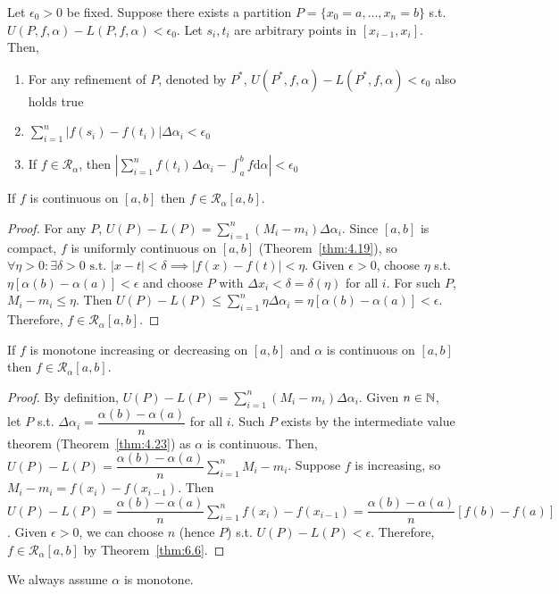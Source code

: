 \begin{thm}[7]
	Let $\epsilon_0>0$ be fixed. Suppose there exists a partition $P=\{x_0=a,\ldots ,x_n=b\} $ s.t. $U(P,f,\alpha)-L(P,f,\alpha)<\epsilon_0$.
	Let $s_{i},t_{i}$ are arbitrary points in $[x_{i-1},x_i]$.
	Then,
	\begin{enumerate}
		\item For any refinement of $P$, denoted by $P^{*}$, $U(P^{*},f,\alpha)-L(P^{*},f,\alpha)<\epsilon_0$ also holds true
		\item  $\sum_{i=1}^{n}{\left|f(s_i)-f(t_i)\right| \Delta \alpha_i}<\epsilon_0$
		\item If $f \in \mathscr{R}_{\alpha}$, then $\left| \sum_{i=1}^{n}{f(t_i) \Delta \alpha_i}-\int_{a}^{b}{f\mathrm{d}\alpha} \right| <\epsilon_0$
	\end{enumerate}
\end{thm}


\begin{thm}[8]
	If $f$ is continuous on $[a,b]$ then $f \in \mathscr{R}_{\alpha}[a,b]$.
	\begin{proof}
		For any $P$, $U(P)-L(P)=\sum_{i=1}^{n}{(M_i - m_i) \Delta \alpha_i}$.
		Since $[a,b]$ is compact, $f$ is uniformly continuous on $[a,b]$ (Theorem~\ref{thm:4.19}), so $\forall{\eta > 0}: \exists{\delta > 0} \text{ s.t. } |x-t|<\delta \implies |f(x)-f(t)|<\eta$.
		Given $\epsilon > 0$, choose $\eta$ s.t. $\eta[\alpha(b)-\alpha(a)]<\epsilon$ and choose $P$ with $\Delta x_i<\delta=\delta(\eta)$ for all $i$.
		For such $P$, $M_i-m_i \le \eta$.
		Then $U(P)-L(P)\le \sum_{i=1}^{n}{\eta \Delta \alpha_i }=\eta[\alpha(b)-\alpha(a)]<\epsilon$.
		Therefore, $f \in \mathscr{R}_{\alpha}[a,b]$.
	\end{proof}
\end{thm}

\begin{thm}[9]
	If $f$ is monotone increasing or decreasing on $[a,b]$ and $\alpha$ is continuous on $[a,b]$ then $f \in \mathscr{R}_{\alpha}[a,b]$.
	\begin{proof}
		By definition, $U(P)-L(P)=\sum_{i=1}^{n}{(M_{i}-m_{i}) \Delta \alpha_i}$.
		Given $n \in \mathbb{N}$, let $P$ s.t. $\Delta \alpha_i = \dfrac{\alpha(b)-\alpha(a)}{n}$ for all $i$.
		Such $P$ exists by the intermediate value theorem (Theorem~\ref{thm:4.23}) as $\alpha$ is continuous.
		Then, $U(P)-L(P)=\dfrac{\alpha(b)-\alpha(a)}{n} \sum_{i=1}^{n}{M_{i}-m_{i}}$.
		Suppose $f$ is increasing, so $M_i - m_i=f(x_i)-f(x_{i-1})$.
		Then $U(P)-L(P)=\dfrac{\alpha(b)-\alpha(a)}{n}\sum_{i=1}^{n}{f(x_i)-f(x_{i-1})}=\dfrac{\alpha(b)-\alpha(a)}{n}[f(b)-f(a)]$.
		Given $\epsilon>0$, we can choose $n$ (hence $P$) s.t. $U(P)-L(P)<\epsilon$. Therefore, $f \in \mathscr{R}_{\alpha}[a,b]$ by Theorem~\ref{thm:6.6}.
	\end{proof}
	\begin{note}
		We always assume $\alpha$ is monotone.
	\end{note}
\end{thm}

